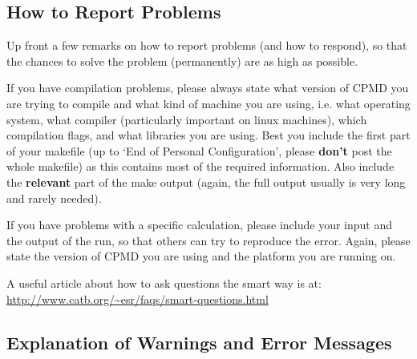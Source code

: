 \documentclass[twoside,10pt,titlepage,a4paper]{article}
\newcommand{\htref}[2]{\href{#1}{#2}}
\newcommand{\htref}[2]{\htmladdnormallink{#2}{#1}}
\begin{document}
\subsection{How to Report Problems}
Up front a few remarks on how to report problems (and how to respond),
so that the chances to solve the problem (permanently)
are as high as possible.

If you have compilation problems, please always state what version of
CPMD you are trying to compile and what kind of machine you are using,
i.e. what operating system, what compiler (particularly important on
linux machines), which compilation flags, and what libraries you are
using. Best you include the first part of your makefile (up to `End of
Personal Configuration', please \textbf{don't} post the whole makefile)
as this contains most of the required information. Also include the
\textbf{relevant} part of the make output (again, the full output
usually is very long and rarely needed).

If you have problems with a specific calculation, please include your
input and the output of the run, so that others can try to reproduce
the error. Again, please state the version of CPMD you are using and
the platform you are running on.

A useful article about how to ask questions the smart way is at:\\
\htref{http://www.catb.org/~esr/faqs/smart-questions.html}{http://www.catb.org/\~{}esr/faqs/smart-questions.html}

\subsection{Explanation of Warnings and Error Messages}
\label{sec:expl-warn-error}
\end{document}

